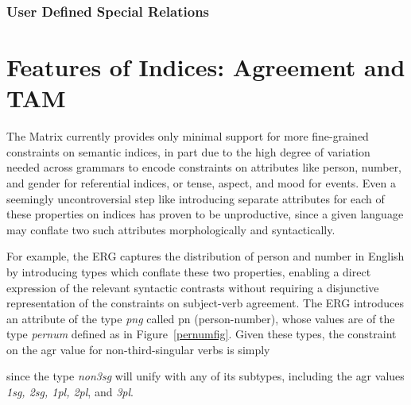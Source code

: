\documentclass[12pt]{article}
\newcommand{\es}{\enumsentence}
\begin{document}
\subsubsection{User Defined Special Relations}


\section{Features of Indices: Agreement and TAM}
\label{AgrTAM}

The Matrix currently provides only minimal support for more fine-grained
constraints on semantic indices, in part due to the high degree of variation
needed across grammars to encode constraints on attributes like person, number,
and gender for referential indices, or tense, aspect, and mood for events.
Even a seemingly uncontroversial step like introducing separate attributes for 
each of these properties on indices has proven to be unproductive, since
a given language may conflate two such attributes morphologically and
syntactically.

For example, the ERG captures the distribution of person and number in English
by introducing types which conflate these two properties, enabling a direct
expression of the relevant syntactic contrasts without requiring a disjunctive
representation of the constraints on subject-verb agreement.  The ERG 
introduces an attribute of the type {\it png} called {\sc pn} (person-number),
whose values are of the type {\it pernum} defined as in Figure~\ref{pernumfig}.
Given these types, the constraint on the {\sc agr} value for
non-third-singular verbs is simply\\

\es{
\begin{avm}
\[ {\it non3sg-verb} \\
   {\sc agr} & \[ {\sc pn} & {\it non3sg} \] \]
\end{avm}\\
}

\noindent
since the type {\it non3sg} will unify with any of its subtypes, including the
{\sc agr} values {\it 1sg, 2sg, 1pl, 2pl}, and {\it 3pl}.
\end{document}
